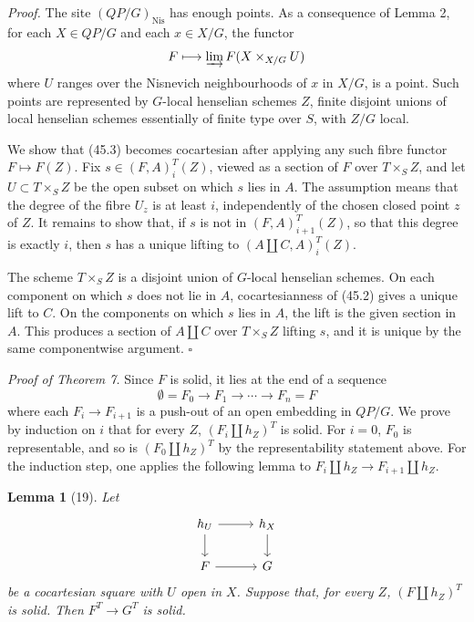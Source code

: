 \documentclass[11pt]{article}
\newcommand{\Nis}{\mathrm{Nis}}
\theoremstyle{deligne}
\newtheorem*{lemma*}{Lemma}
\newenvironment{proofdel}{\noindent\textit{Proof.}}{\hfill$\square$}
\newenvironment{proofnamed}[1]{\noindent\textit{#1.}}{}
\begin{document}
\begin{proofdel}
The site \((QP/G)_{\Nis}\) has enough points. As a consequence of Lemma 2, for each \(X\in QP/G\) and each \(x\in X/G\), the functor
\[
F\longmapsto \varinjlim F(X\times_{X/G}U)
\]
where \(U\) ranges over the Nisnevich neighbourhoods of \(x\) in \(X/G\), is a point. Such points are represented by \(G\)-local henselian schemes \(Z\), finite disjoint unions of local henselian schemes essentially of finite type over \(S\), with \(Z/G\) local.

We show that (45.3) becomes cocartesian after applying any such fibre functor \(F\mapsto F(Z)\). Fix \(s\in (F,A)^T_i(Z)\), viewed as a section of \(F\) over \(T\times_S Z\), and let \(U\subset T\times_S Z\) be the open subset on which \(s\) lies in \(A\). The assumption means that the degree of the fibre \(U_z\) is at least \(i\), independently of the chosen closed point \(z\) of \(Z\). It remains to show that, if \(s\) is not in \((F,A)^T_{i+1}(Z)\), so that this degree is exactly \(i\), then \(s\) has a unique lifting to \((A\amalg C,A)^T_i(Z)\).

The scheme \(T\times_S Z\) is a disjoint union of \(G\)-local henselian schemes. On each component on which \(s\) does not lie in \(A\), cocartesianness of (45.2) gives a unique lift to \(C\). On the components on which \(s\) lies in \(A\), the lift is the given section in \(A\). This produces a section of \(A\amalg C\) over \(T\times_S Z\) lifting \(s\), and it is unique by the same componentwise argument.
\end{proofdel}

\begin{proofnamed}{Proof of Theorem 7}
Since \(F\) is solid, it lies at the end of a sequence
\[
\emptyset=F_0\to F_1\to\cdots\to F_n=F
\]
where each \(F_i\to F_{i+1}\) is a push-out of an open embedding in \(QP/G\). We prove by induction on \(i\) that for every \(Z\), \((F_i\amalg h_Z)^T\) is solid. For \(i=0\), \(F_0\) is representable, and so is \((F_0\amalg h_Z)^T\) by the representability statement above. For the induction step, one applies the following lemma to \(F_i\amalg h_Z\to F_{i+1}\amalg h_Z\).
\end{proofnamed}

\begin{lemma*}[19]
Let
\[
\begin{tikzcd}[column sep=2.8em,row sep=1.8em]
h_U \arrow[r] \arrow[d] & h_X \arrow[d]\\
F \arrow[r] & G
\end{tikzcd}
\]
be a cocartesian square with \(U\) open in \(X\). Suppose that, for every \(Z\), \((F\amalg h_Z)^T\) is solid. Then \(F^T\to G^T\) is solid.
\end{lemma*}
\end{document}
